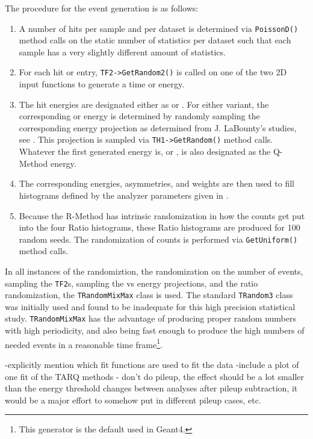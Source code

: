 The procedure for the event generation is as follows:
\begin{enumerate}
	\item{A number of hits per sample and per dataset is determined via \texttt{PoissonD()} method calls on the static number of statistics per dataset such that each sample has a very slightly different amount of statistics.} 
	\item{For each hit or entry, \texttt{TF2->GetRandom2()} is called on one of the two 2D input functions to generate a time or energy.}
	\item{The hit energies are designated either as \RE or \RW. For either variant, the corresponding \RW or \RE energy is determined by randomly sampling the corresponding energy projection as determined from J. LaBounty's studies, see . This projection is sampled via \texttt{TH1->GetRandom()} method calls. Whatever the first generated energy is, \RE or \RW, is also designated as the Q-Method energy.}
	\item{The corresponding energies, asymmetries, and weights are then used to fill histograms defined by the analyzer parameters given in .}
	\item{Because the R-Method has intrinsic randomization in how the counts get put into the four Ratio histograms, these Ratio histograms are produced for 100 random seeds. The randomization of counts is performed via \texttt{GetUniform()} method calls.} 
\end{enumerate}


In all instances of the randomiztion, the randomization on the number of events, sampling the \texttt{TF2}s, sampling the \RE vs \RW energy projections, and the ratio randomization, the \ROOT\texttt{TRandomMixMax} class is used. The standard \texttt{TRandom3} class was initially used and found to be inadequate for this high precision statistical study. \texttt{TRandomMixMax} has the advantage of producing proper random numbers with high periodicity, and also being fast enough to produce the high numbers of needed events in a reasonable time frame\footnote{This generator is the default used in Geant4.}\cite{TRandom}.










-explicitly mention which fit functions are used to fit the data
-include a plot of one fit of the TARQ methods
- don't do pileup, the effect should be a lot smaller than the energy threshold changes between analyses after pileup subtraction, it would be a major effort to somehow put in different pileup cases, etc.

